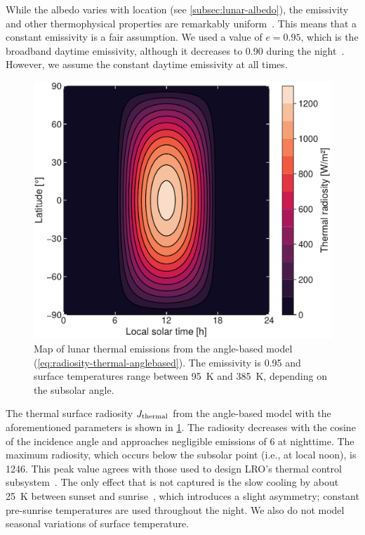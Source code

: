 While the albedo varies with location (see \cref{subsec:lunar-albedo}), the emissivity and other thermophysical properties are remarkably uniform~\cite{Hayne2017}. This means that a constant emissivity is a fair assumption. We used a value of $e = 0.95$, which is the broadband daytime emissivity, although it decreases to 0.90 during the night~\cite{Bandfield2015}. However, we assume the constant daytime emissivity at all times.

\begin{figure}[t]
    \centering
    \includegraphics[width=\linewidth]{figures/plots/thermal_map.pdf}
    \caption{Map of lunar thermal emissions from the angle-based model (\cref{eq:radiosity-thermal-anglebased}). The emissivity is 0.95 and surface temperatures range between \qty{95}{\K} and \qty{385}{\K}, depending on the subsolar angle.}
    \label{fig:thermal-map}
\end{figure}

The thermal surface radiosity $J_\textnormal{thermal}$ from the angle-based model with the aforementioned parameters is shown in \cref{fig:thermal-map}. The radiosity decreases with the cosine of the incidence angle and approaches negligible emissions of \qty{6}{\irr} at nighttime. The maximum radiosity, which occurs below the subsolar point (i.e., at local noon), is \qty{1246}{\irr}. This peak value agrees with those used to design \gls{LRO}'s thermal control subsystem~\cite{Tooley2010}. The only effect that is not captured is the slow cooling by about \qty{25}{\K} between sunset and sunrise~\cite{Vasavada2012}, which introduces a slight asymmetry; constant pre-sunrise temperatures are used throughout the night. We also do not model seasonal variations of surface temperature.





